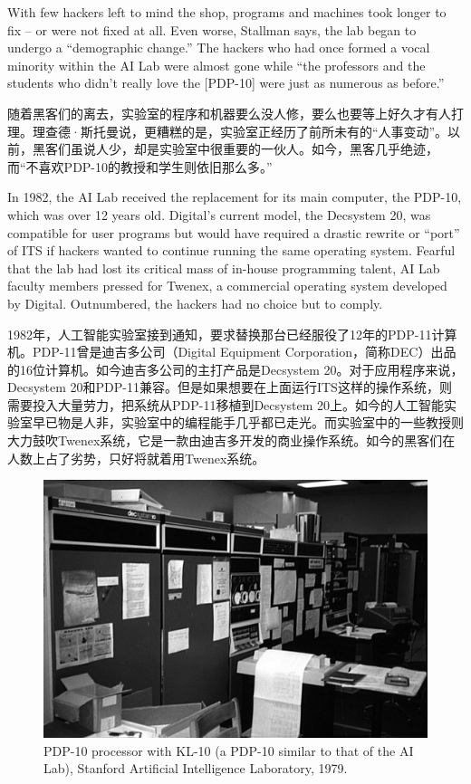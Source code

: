 \ifdefined\eng
With few hackers left to mind the shop, programs and machines took longer to fix -- or were not fixed at all.  Even worse, Stallman says, the lab began to undergo a ``demographic change.'' The hackers who had once formed a vocal minority within the AI Lab were almost gone while ``the professors and the students who didn't really love the [PDP-10] were just as numerous as before.''
\fi

\ifdefined\chs
随着黑客们的离去，实验室的程序和机器要么没人修，要么也要等上好久才有人打理。理查德·斯托曼说，更糟糕的是，实验室正经历了前所未有的``人事变动''。以前，黑客们虽说人少，却是实验室中很重要的一伙人。如今，黑客几乎绝迹，而``不喜欢PDP-10的教授和学生则依旧那么多。''
\fi

\ifdefined\eng
In 1982, the AI Lab received the replacement for its main computer, the PDP-10, which was over 12 years old. Digital's current model, the Decsystem 20, was compatible for user programs but would have required a drastic rewrite or ``port'' of ITS if hackers wanted to continue running the same operating system. Fearful that the lab had lost its critical mass of in-house programming talent, AI Lab faculty members pressed for Twenex, a commercial operating system developed by Digital. Outnumbered, the hackers had no choice but to comply.
\fi

\ifdefined\chs
1982年，人工智能实验室接到通知，要求替换那台已经服役了12年的PDP-11计算机。PDP-11曾是迪吉多公司（Digital Equipment Corporation，简称DEC）出品的16位计算机。如今迪吉多公司的主打产品是Decsystem 20。对于应用程序来说，Decsystem 20和PDP-11兼容。但是如果想要在上面运行ITS这样的操作系统，则需要投入大量劳力，把系统从PDP-11移植到Decsystem 20上。如今的人工智能实验室早已物是人非，实验室中的编程能手几乎都已走光。而实验室中的一些教授则大力鼓吹Twenex系统，它是一款由迪吉多开发的商业操作系统。如今的黑客们在人数上占了劣势，只好将就着用Twenex系统。
\fi

\ifdefined\eng
\begin{figure}[ht] \centering
  \includegraphics{KL10_1979}
  \caption{PDP-10 processor with KL-10 (a PDP-10 similar to that of the AI Lab), Stanford Artificial Intelligence Laboratory, 1979.}
\end{figure}
\fi

